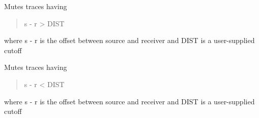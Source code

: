 \documentclass[letterpaper,10pt,english]{sphinxmanual}
\begin{document}
\begin{fulllineitems}
\label{\detokenize{ref/seisflows.tools:seisflows.tools.signal.mute_long_offsets}}
Mutes traces having
\begin{quote}

\textbar{}\textbar{} s - r \textbar{}\textbar{} \textgreater{} DIST
\end{quote}

where \textbar{}\textbar{} s - r \textbar{}\textbar{} is the offset between source and receiver and
DIST is a user-supplied cutoff

\end{fulllineitems}


\begin{fulllineitems}
\label{\detokenize{ref/seisflows.tools:seisflows.tools.signal.mute_short_offsets}}
Mutes traces having
\begin{quote}

\textbar{}\textbar{} s - r \textbar{}\textbar{} \textless{} DIST
\end{quote}

where \textbar{}\textbar{} s - r \textbar{}\textbar{} is the offset between source and receiver and
DIST is a user-supplied cutoff

\end{fulllineitems}


\begin{fulllineitems}
\label{\detokenize{ref/seisflows.tools:seisflows.tools.signal.sconvolve}}
\end{fulllineitems}

\end{document}
